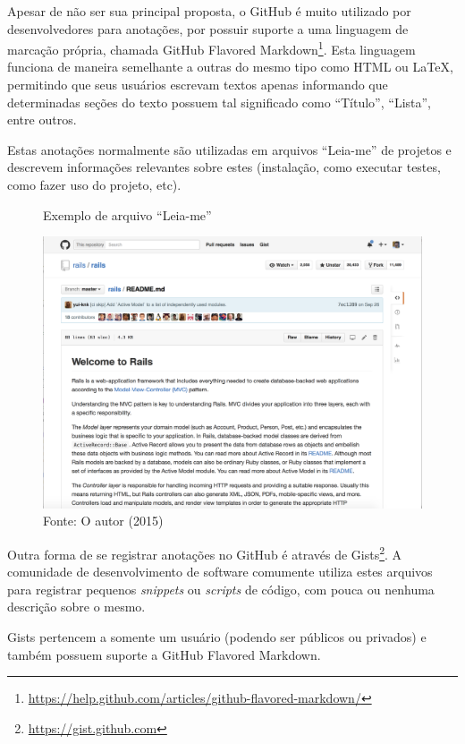Apesar de não ser sua principal proposta, o GitHub é muito utilizado por desenvolvedores para anotações, por possuir suporte a uma linguagem de marcação própria, chamada GitHub Flavored Markdown\footnote{\url{https://help.github.com/articles/github-flavored-markdown/}}. Esta linguagem funciona de maneira semelhante a outras do mesmo tipo como HTML ou LaTeX, permitindo que seus usuários escrevam textos apenas informando que determinadas seções do texto possuem tal significado como ``Título'', ``Lista'', entre outros.

Estas anotações normalmente são utilizadas em arquivos ``Leia-me'' de projetos e descrevem informações relevantes sobre estes (instalação, como executar testes, como fazer uso do projeto, etc).

\begin{figure}[h]
	\centering
    \caption{Exemplo de arquivo ``Leia-me''}
    \includegraphics[width=15cm]{Imagens/print-readme.png}
	\caption*{Fonte: O autor (2015)}
\end{figure}


Outra forma de se registrar anotações no GitHub é através de Gists\footnote{\url{https://gist.github.com}}. A comunidade de desenvolvimento de software comumente utiliza estes arquivos para registrar pequenos \textit{snippets} ou \textit{scripts} de código, com pouca ou nenhuma descrição sobre o mesmo.

Gists pertencem a somente um usuário (podendo ser públicos ou privados) e também possuem suporte a GitHub Flavored Markdown.

